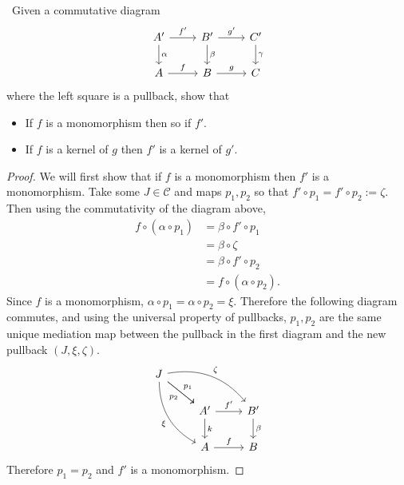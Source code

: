 \documentclass[11pt]{amsart}
\theoremstyle{definition}
\numberwithin{theorem}{section}
\numberwithin{definition}{section}
\numberwithin{equation}{section}
\def\scriptc{{\mathcal C}}
\begin{document}
\medskip {}\ Given a commutative diagram
\begin{equation*}
	\begin{tikzcd}
		A' \arrow{r}{f'}\arrow{d}{\alpha} & B'  \arrow{r}{g'} \arrow{d}{\beta} &C' \arrow{d}{\gamma} \\
		A \arrow{r}{f} &B \arrow{r}{g} & C
	\end{tikzcd}
\end{equation*}
where the left square is a pullback, show that 
\begin{itemize}
	\item If $f$ is a monomorphism then so if $f'$.
	\item If $f$ is a kernel of $g$ then $f'$ is a kernel of $g'.$
\end{itemize}
\begin{proof}
	We will first show that if $f$ is a monomorphism then $f'$ is a monomorphism. Take some $J \in \scriptc$ and maps $p_1, p_2$ so that $f' \circ p_1 = f' \circ p_2 := \zeta$. Then using the commutativity of the diagram above, 
	\begin{equation*}
		\begin{aligned}
			f \circ (\alpha \circ p_1) &= \beta \circ f' \circ p_1 \\
			&= \beta \circ \zeta \\
			&=  \beta \circ f' \circ p_2 \\
			&= f \circ (\alpha \circ p_2 ).
		\end{aligned}
	\end{equation*}
	Since $f$ is a monomorphism, $\alpha \circ p_1 = \alpha  \circ p_2 = \xi$. Therefore the following diagram commutes, and using the universal property of pullbacks, $p_1, p_2$ are the same unique mediation map between the pullback in the first diagram and the new pullback $(J, \xi, \zeta)$.
	\begin{equation*}
	\begin{tikzcd}
		 	J \arrow[rrd, bend left, "\zeta"] \arrow[rd, "p_1"] \arrow[rd, swap, "p_2"] \arrow[rdd,swap, bend right,  "\xi"] \\
		 	& A' \arrow[r, "f'"] \arrow[d, "k"] & B' \arrow[d, "\beta"] \\
		 	& A \arrow[r, "f"] & B
		 \end{tikzcd}
	\end{equation*}
	Therefore $p_1 = p_2$ and $f'$ is a monomorphism.
\end{proof}
\end{document}
